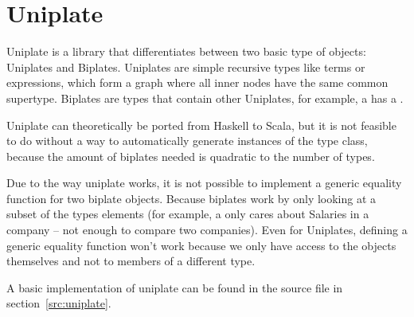 \section{Uniplate}

Uniplate is a library that differentiates between two basic type of
objects: Uniplates and Biplates. Uniplates are simple recursive types
like terms or expressions, which form a graph where all inner nodes have
the same common supertype. Biplates are types that contain other Uniplates,
for example, a  has a .


Uniplate can theoretically be ported from Haskell to Scala, but it is not
feasible to do without a way to automatically generate instances of the
 type class, because the amount of biplates needed is quadratic
to the number of types.

Due to the way uniplate works, it is not possible to implement a generic
equality function for two biplate objects. Because biplates work by only
looking at a subset of the types elements (for example, a 
only cares about Salaries in a company -- not enough to compare two companies). Even
for Uniplates, defining a generic equality function won't work because we
only have access to the objects themselves and not to members of a different
type.

A basic implementation of uniplate can be found in the 
source file in section~\ref{src:uniplate}.
